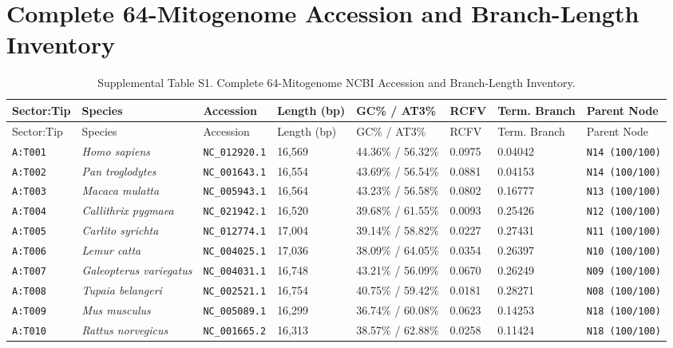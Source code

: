 \documentclass[10pt,letterpaper]{article}
\begin{document}
\section{Complete 64-Mitogenome Accession and Branch-Length Inventory}
\footnotesize
\begin{longtable}{llllllll}
\caption{Supplemental Table S1. Complete 64-Mitogenome NCBI Accession and Branch-Length Inventory.} \\
\toprule
Sector:Tip & Species & Accession & Length (bp) & GC\% / AT3\% & RCFV & Term. Branch & Parent Node \\
\midrule
\endfirsthead
\toprule
Sector:Tip & Species & Accession & Length (bp) & GC\% / AT3\% & RCFV & Term. Branch & Parent Node \\
\midrule
\endhead
\texttt{A:T001} & \textit{Homo sapiens} & \texttt{NC\_012920.1} & 16,569 & 44.36\% / 56.32\% & 0.0975 & 0.04042 & \texttt{N14 (100/100)} \\
\texttt{A:T002} & \textit{Pan troglodytes} & \texttt{NC\_001643.1} & 16,554 & 43.69\% / 56.54\% & 0.0881 & 0.04153 & \texttt{N14 (100/100)} \\
\texttt{A:T003} & \textit{Macaca mulatta} & \texttt{NC\_005943.1} & 16,564 & 43.23\% / 56.58\% & 0.0802 & 0.16777 & \texttt{N13 (100/100)} \\
\texttt{A:T004} & \textit{Callithrix pygmaea} & \texttt{NC\_021942.1} & 16,520 & 39.68\% / 61.55\% & 0.0093 & 0.25426 & \texttt{N12 (100/100)} \\
\texttt{A:T005} & \textit{Carlito syrichta} & \texttt{NC\_012774.1} & 17,004 & 39.14\% / 58.82\% & 0.0227 & 0.27431 & \texttt{N11 (100/100)} \\
\texttt{A:T006} & \textit{Lemur catta} & \texttt{NC\_004025.1} & 17,036 & 38.09\% / 64.05\% & 0.0354 & 0.26397 & \texttt{N10 (100/100)} \\
\texttt{A:T007} & \textit{Galeopterus variegatus} & \texttt{NC\_004031.1} & 16,748 & 43.21\% / 56.09\% & 0.0670 & 0.26249 & \texttt{N09 (100/100)} \\
\texttt{A:T008} & \textit{Tupaia belangeri} & \texttt{NC\_002521.1} & 16,754 & 40.75\% / 59.42\% & 0.0181 & 0.28271 & \texttt{N08 (100/100)} \\
\texttt{A:T009} & \textit{Mus musculus} & \texttt{NC\_005089.1} & 16,299 & 36.74\% / 60.08\% & 0.0623 & 0.14253 & \texttt{N18 (100/100)} \\
\texttt{A:T010} & \textit{Rattus norvegicus} & \texttt{NC\_001665.2} & 16,313 & 38.57\% / 62.88\% & 0.0258 & 0.11424 & \texttt{N18 (100/100)} \\

\end{longtable}
\end{document}
